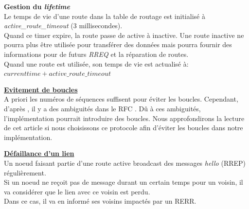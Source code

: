\documentclass[a4paper, 12pt]{report}
\begin{document}
        \textbf{Gestion du \textit{lifetime}}\\
            Le temps de vie d'une route dans la table de routage est initialisé à \textit{active\_route\_timeout} (3 millisecondes).\\
            Quand ce timer expire, la route passe de active à inactive. Une route inactive ne pourra plus être utilisée pour transférer des données
            mais pourra fournir des informations pour de futurs \textit{RREQ} et la réparation de routes.\\
            Quand une route est utilisée, son temps de vie  est actualisé à: $current time + active\_route\_timeout$

        \vspace{1cm}
        \underline{\textbf{Evitement de boucles}}\\
            A priori les numéros de séquences suffisent pour éviter les boucles. Cependant, d'après \cite{loop_aodv_w}, il y a des
            ambiguités dans le RFC \cite{aodv_w}. Dû à ces ambiguités, l'implémentation pourrait introduire des boucles.
            Nous approfondirons la lecture de cet article si nous choisissons ce protocole afin d'éviter les boucles dans notre implémentation.
        
        \underline{\textbf{Défaillance d'un lien}}\\
            Un noeud faisant partie d'une route active broadcast des messages \textit{hello} (RREP)
            régulièrement.\\
            Si un noeud ne reçoit pas de message durant un certain temps pour un voisin, il va considérer
            que le lien avec ce voisin est perdu.\\
            Dans ce cas, il va en informé ses voisins impactés par un RERR. 
        
\end{document}
